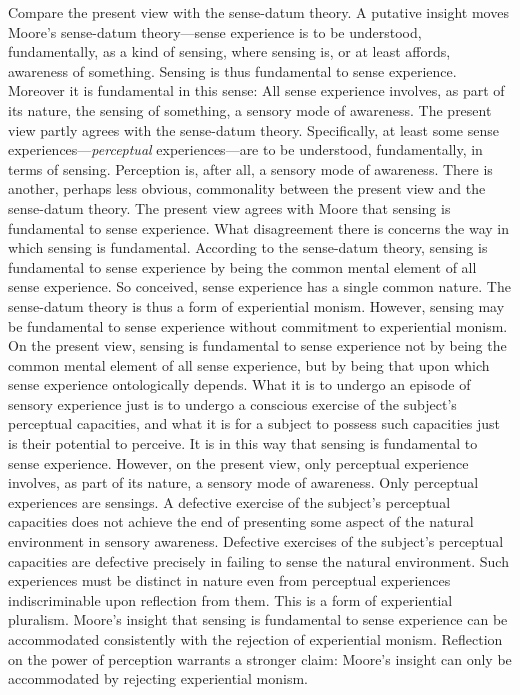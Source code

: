 \documentclass[12pt]{article}
\begin{document}
Compare the present view with the sense-datum theory. A putative insight moves Moore's sense-datum theory---sense experience is to be understood, fundamentally, as a kind of sensing, where sensing is, or at least affords, awareness of something. Sensing is thus fundamental to sense experience. Moreover it is fundamental in this sense: All sense experience involves, as part of its nature, the sensing of something, a sensory mode of awareness. The present view partly agrees with the sense-datum theory. Specifically, at least some sense experiences---\emph{perceptual} experiences---are to be understood, fundamentally, in terms of sensing. Perception is, after all, a sensory mode of awareness. There is another, perhaps less obvious, commonality between the present view and the sense-datum theory. The present view agrees with Moore that sensing is fundamental to sense experience. What disagreement there is concerns the way in which sensing is fundamental. According to the sense-datum theory, sensing is fundamental to sense experience by being the common mental element of all sense experience. So conceived, sense experience has a single common nature. The sense-datum theory is thus a form of experiential monism. However, sensing may be fundamental to sense experience without commitment to experiential monism. On the present view, sensing is fundamental to sense experience not by being the common mental element of all sense experience, but by being that upon which sense experience ontologically depends. What it is to undergo an episode of sensory experience just is to undergo a conscious exercise of the subject’s perceptual capacities, and what it is for a subject to possess such capacities just is their potential to perceive. It is in this way that sensing is fundamental to sense experience. However, on the present view, only perceptual experience involves, as part of its nature, a sensory mode of awareness. Only perceptual experiences are sensings. A defective exercise of the subject's perceptual capacities does not achieve the end of presenting some aspect of the natural environment in sensory awareness. Defective exercises of the subject's perceptual capacities are defective precisely in failing to sense the natural environment. Such experiences must be distinct in nature even from perceptual experiences indiscriminable upon reflection from them. This is a form of experiential pluralism. Moore's insight that sensing is fundamental to sense experience can be accommodated consistently with the rejection of experiential monism. Reflection on the power of perception warrants a stronger claim: Moore's insight can only be accommodated by rejecting experiential monism.
\end{document}
